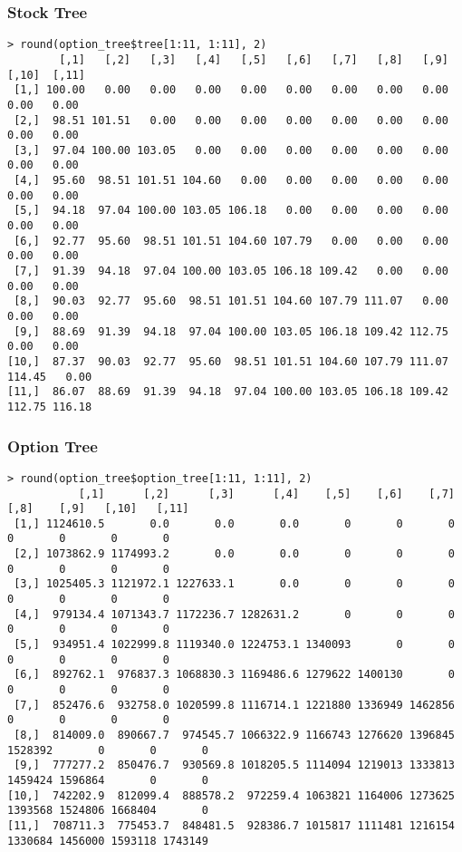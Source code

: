 \documentclass[11pt]{scrartcl}
\begin{document}
\begin{landscape}

\subsubsection{Stock Tree}

\begin{lstlisting}
> round(option_tree$tree[1:11, 1:11], 2)
        [,1]   [,2]   [,3]   [,4]   [,5]   [,6]   [,7]   [,8]   [,9]  [,10]  [,11]
 [1,] 100.00   0.00   0.00   0.00   0.00   0.00   0.00   0.00   0.00   0.00   0.00
 [2,]  98.51 101.51   0.00   0.00   0.00   0.00   0.00   0.00   0.00   0.00   0.00
 [3,]  97.04 100.00 103.05   0.00   0.00   0.00   0.00   0.00   0.00   0.00   0.00
 [4,]  95.60  98.51 101.51 104.60   0.00   0.00   0.00   0.00   0.00   0.00   0.00
 [5,]  94.18  97.04 100.00 103.05 106.18   0.00   0.00   0.00   0.00   0.00   0.00
 [6,]  92.77  95.60  98.51 101.51 104.60 107.79   0.00   0.00   0.00   0.00   0.00
 [7,]  91.39  94.18  97.04 100.00 103.05 106.18 109.42   0.00   0.00   0.00   0.00
 [8,]  90.03  92.77  95.60  98.51 101.51 104.60 107.79 111.07   0.00   0.00   0.00
 [9,]  88.69  91.39  94.18  97.04 100.00 103.05 106.18 109.42 112.75   0.00   0.00
[10,]  87.37  90.03  92.77  95.60  98.51 101.51 104.60 107.79 111.07 114.45   0.00
[11,]  86.07  88.69  91.39  94.18  97.04 100.00 103.05 106.18 109.42 112.75 116.18
\end{lstlisting}

\subsubsection{Option Tree}

\begin{lstlisting}
> round(option_tree$option_tree[1:11, 1:11], 2)
           [,1]      [,2]      [,3]      [,4]    [,5]    [,6]    [,7]    [,8]    [,9]   [,10]   [,11]
 [1,] 1124610.5       0.0       0.0       0.0       0       0       0       0       0       0       0
 [2,] 1073862.9 1174993.2       0.0       0.0       0       0       0       0       0       0       0
 [3,] 1025405.3 1121972.1 1227633.1       0.0       0       0       0       0       0       0       0
 [4,]  979134.4 1071343.7 1172236.7 1282631.2       0       0       0       0       0       0       0
 [5,]  934951.4 1022999.8 1119340.0 1224753.1 1340093       0       0       0       0       0       0
 [6,]  892762.1  976837.3 1068830.3 1169486.6 1279622 1400130       0       0       0       0       0
 [7,]  852476.6  932758.0 1020599.8 1116714.1 1221880 1336949 1462856       0       0       0       0
 [8,]  814009.0  890667.7  974545.7 1066322.9 1166743 1276620 1396845 1528392       0       0       0
 [9,]  777277.2  850476.7  930569.8 1018205.5 1114094 1219013 1333813 1459424 1596864       0       0
[10,]  742202.9  812099.4  888578.2  972259.4 1063821 1164006 1273625 1393568 1524806 1668404       0
[11,]  708711.3  775453.7  848481.5  928386.7 1015817 1111481 1216154 1330684 1456000 1593118 1743149
\end{lstlisting}

\end{landscape}
\end{document}
